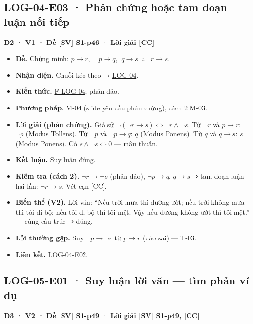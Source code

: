 \documentclass[
  10pt,
  twoside,openany]{book}
\providecommand{\tightlist}{%
  \setlength{\itemsep}{0pt}\setlength{\parskip}{0pt}}
\begin{document}
\hypertarget{LOG-04-E03}{%
\subsection{LOG-04-E03 · Phản chứng hoặc tam đoạn luận nối
tiếp}\label{LOG-04-E03}}

\textbf{D2 · V1 · Đề {[}SV{]} S1-p46 · Lời giải {[}CC{]}}

\begin{itemize}
\tightlist
\item
  \textbf{Đề.} Chứng minh: \(p\to r\), \(\ \neg p\to q\),
  \(\ q\to s\ \ \therefore\ \neg r\to s\).
\item
  \textbf{Nhận diện.} Chuỗi kéo theo →
  \protect\hyperlink{LOG-04}{LOG-04}.
\item
  \textbf{Kiến thức.} \protect\hyperlink{F-LOG-04}{F-LOG-04}; phản đảo.
\item
  \textbf{Phương pháp.} \protect\hyperlink{M-04}{M-04} (slide yêu cầu
  phản chứng); cách 2 \protect\hyperlink{M-03}{M-03}.
\item
  \textbf{Lời giải (phản chứng).} Giả sử
  \(\neg(\neg r\to s)\Leftrightarrow\neg r\wedge\neg s\). Từ \(\neg r\)
  và \(p\to r\): \(\neg p\) (Modus Tollens). Từ \(\neg p\) và
  \(\neg p\to q\): \(q\) (Modus Ponens). Từ \(q\) và \(q\to s\): \(s\)
  (Modus Ponens). Có \(s\wedge\neg s\Leftrightarrow0\) --- mâu thuẫn.
\item
  \textbf{Kết luận.} Suy luận đúng.
\item
  \textbf{Kiểm tra (cách 2).} \(\neg r\to\neg p\) (phản đảo),
  \(\neg p\to q\), \(q\to s\) ⇒ tam đoạn luận hai lần: \(\neg r\to s\).
  Vét cạn {[}CC{]}.
\item
  \textbf{Biến thể (V2).} Lời văn: ``Nếu trời mưa thì đường ướt; nếu
  trời không mưa thì tôi đi bộ; nếu tôi đi bộ thì tôi mệt. Vậy nếu đường
  không ướt thì tôi mệt.'' --- cùng cấu trúc ⇒ đúng.
\item
  \textbf{Lỗi thường gặp.} Suy \(\neg p\to\neg r\) từ \(p\to r\) (đảo
  sai) --- \protect\hyperlink{T-03}{T-03}.
\item
  \textbf{Liên kết.} \protect\hyperlink{LOG-04-E02}{LOG-04-E02}.
\end{itemize}

\hypertarget{LOG-05-E01}{%
\subsection{LOG-05-E01 · Suy luận lời văn --- tìm phản ví
dụ}\label{LOG-05-E01}}

\textbf{D3 · V2 · Đề {[}SV{]} S1-p49 · Lời giải {[}SV{]} S1-p49,
{[}CC{]}}
\end{document}
